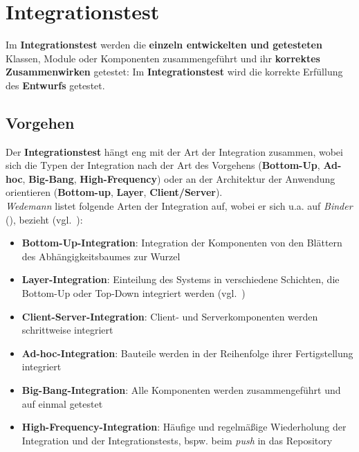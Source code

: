 \section{Integrationstest}
\begin{tcolorbox}[title=Integrationstest]
    Im \textbf{Integrationstest} werden die \textbf{einzeln entwickelten und getesteten} Klassen, Module oder Komponenten zusammengeführt und ihr \textbf{korrektes Zusammenwirken} getestet:
    Im \textbf{Integrationstest} wird die korrekte Erfüllung des \textbf{Entwurfs} getestet.
\end{tcolorbox}

\subsection{Vorgehen}
Der \textbf{Integrationstest} hängt eng mit der Art der Integration zusammen, wobei sich die Typen der Integration nach der Art des Vorgehens (\textbf{Bottom-Up}, \textbf{Ad-hoc}, \textbf{Big-Bang}, \textbf{High-Frequency}) oder an der Architektur der Anwendung orientieren (\textbf{Bottom-up}, \textbf{Layer}, \textbf{Client/Server}).\\

\noindent
\textit{Wedemann} listet folgende Arten der Integration auf, wobei er sich u.a. auf \textit{Binder} (\cite{Bin99}), bezieht (vgl.~\cite[59]{Wed09c}):

\begin{itemize}
    \item \textbf{Bottom-Up-Integration}: Integration der Komponenten von den Blättern des Abhängigkeitsbaumes zur Wurzel
    \item \textbf{Layer-Integration}: Einteilung des Systems in verschiedene Schichten, die Bottom-Up oder Top-Down integriert werden (vgl.~\cite[688]{Bin99})
    \item \textbf{Client-Server-Integration}: Client- und Serverkomponenten werden schrittweise integriert
    \item \textbf{Ad-hoc-Integration}: Bauteile werden in der Reihenfolge ihrer Fertigstellung integriert
    \item \textbf{Big-Bang-Integration}: Alle Komponenten werden zusammengeführt und auf einmal getestet
    \item \textbf{High-Frequency-Integration}: Häufige und regelmäßige Wiederholung der Integration und der Integrationstests, bspw. beim \textit{push} in das Repository
\end{itemize}

